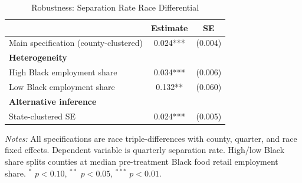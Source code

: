 \begin{table}[htbp]
\centering
\caption{Robustness: Separation Rate Race Differential}
\label{tab:robust}
\begin{tabular}{lcc}
\toprule
 & Estimate & SE \\
\midrule
Main specification (county-clustered) & 0.024*** & (0.004) \\
\addlinespace
\textbf{Heterogeneity} & & \\
\quad High Black employment share & 0.034*** & (0.006) \\
\quad Low Black employment share & 0.132** & (0.060) \\
\addlinespace
\textbf{Alternative inference} & & \\
\quad State-clustered SE & 0.024*** & (0.005) \\
\bottomrule
\end{tabular}
\begin{tablenotes}
\item \textit{Notes:} All specifications are race triple-differences with county, quarter,
and race fixed effects. Dependent variable is quarterly separation rate.
High/low Black share splits counties at median pre-treatment Black food retail employment share.
$^{*}$ $p < 0.10$, $^{**}$ $p < 0.05$, $^{***}$ $p < 0.01$.
\end{tablenotes}
\end{table}
